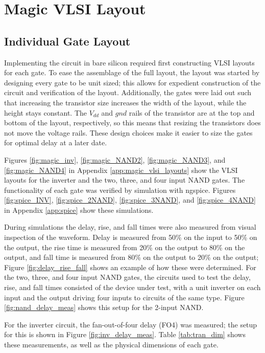 \documentclass[12pt]{article}
\begin{document}
\section{Magic VLSI Layout}
\subsection{Individual Gate Layout}
Implementing the circuit in bare silicon required first constructing VLSI layouts for each gate.
To ease the assemblage of the full layout, the layout was started by designing every gate to be unit sized; this allows for expedient construction of the circuit and verification of the layout.
Additionally, the gates were laid out such that increasing the transistor size increases the width of the layout, while the height stays constant.
The \(V_{dd}\) and \(gnd\) rails of the transistor are at the top and bottom of the layout, respectively, so this means that resizing the transistors does not move the voltage rails.
These design choices make it easier to size the gates for optimal delay at a later date.

Figures \ref{fig:magic_inv}, \ref{fig:magic_NAND2}, \ref{fig:magic_NAND3}, and \ref{fig:magic_NAND4} in Appendix \ref{app:magic_vlsi_layouts} show the VLSI layouts for the inverter and the two, three, and four input NAND gates.
The functionality of each gate was verified by simulation with ngspice.
Figures \ref{fig:spice_INV}, \ref{fig:spice_2NAND}, \ref{fig:spice_3NAND}, and \ref{fig:spice_4NAND} in Appendix \ref{app:spice} show these simulations.

During simulations the delay, rise, and fall times were also measured from visual inspection of the waveform.
Delay is measured from 50\% on the input to 50\% on the output, the rise time is measured from 20\% on the output to 80\% on the output, and fall time is measured from 80\% on the output to 20\% on the output; Figure \ref{fig:delay_rise_fall} shows an example of how these were determined.
For the two, three, and four input NAND gates, the circuits used to test the delay, rise, and fall times consisted of the device under test, with a unit inverter on each input and the output driving four inputs to circuits of the same type.
Figure \ref{fig:nand_delay_meas} shows this setup for the 2-input NAND.

For the inverter circuit, the fan-out-of-four delay (FO4) was measured; the setup for this is shown in Figure \ref{fig:inv_delay_meas}.
Table \ref{tab:tran_dim} shows these measurements, as well as the physical dimensions of each gate.
\end{document}
